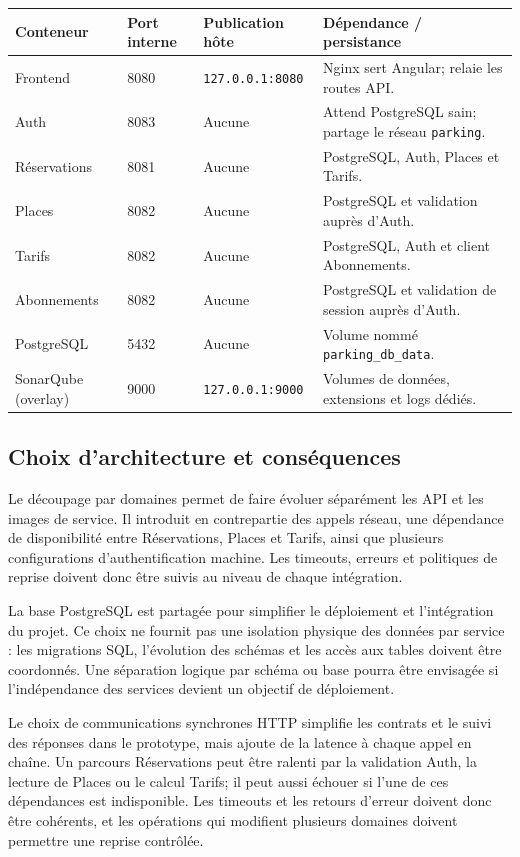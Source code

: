 \documentclass[11pt,a4paper]{report}
\begin{document}
\begin{longtable}{p{3.1cm}p{3cm}p{3cm}p{4.2cm}}
\toprule
\textbf{Conteneur} & \textbf{Port interne} & \textbf{Publication hôte} & \textbf{Dépendance / persistance} \\
\midrule
Frontend & 8080 & \texttt{127.0.0.1:8080} & Nginx sert Angular; relaie les routes API. \\
Auth & 8083 & Aucune & Attend PostgreSQL sain; partage le réseau \texttt{parking}. \\
Réservations & 8081 & Aucune & PostgreSQL, Auth, Places et Tarifs. \\
Places & 8082 & Aucune & PostgreSQL et validation auprès d'Auth. \\
Tarifs & 8082 & Aucune & PostgreSQL, Auth et client Abonnements. \\
Abonnements & 8082 & Aucune & PostgreSQL et validation de session auprès d'Auth. \\
PostgreSQL & 5432 & Aucune & Volume nommé \texttt{parking\_db\_data}. \\
SonarQube (overlay) & 9000 & \texttt{127.0.0.1:9000} & Volumes de données, extensions et logs dédiés. \\
\bottomrule
\end{longtable}

\subsection{Choix d'architecture et conséquences}
Le découpage par domaines permet de faire évoluer séparément les API et les images de service. Il introduit en contrepartie des appels réseau, une dépendance de disponibilité entre Réservations, Places et Tarifs, ainsi que plusieurs configurations d'authentification machine. Les timeouts, erreurs et politiques de reprise doivent donc être suivis au niveau de chaque intégration.

La base PostgreSQL est partagée pour simplifier le déploiement et l'intégration du projet. Ce choix ne fournit pas une isolation physique des données par service : les migrations SQL, l'évolution des schémas et les accès aux tables doivent être coordonnés. Une séparation logique par schéma ou base pourra être envisagée si l'indépendance des services devient un objectif de déploiement.

Le choix de communications synchrones HTTP simplifie les contrats et le suivi des réponses dans le prototype, mais ajoute de la latence à chaque appel en chaîne. Un parcours Réservations peut être ralenti par la validation Auth, la lecture de Places ou le calcul Tarifs; il peut aussi échouer si l'une de ces dépendances est indisponible. Les timeouts et les retours d'erreur doivent donc être cohérents, et les opérations qui modifient plusieurs domaines doivent permettre une reprise contrôlée.
\end{document}
